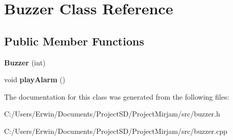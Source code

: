 \hypertarget{class_buzzer}{}\section{Buzzer Class Reference}
\label{class_buzzer}
\subsection*{Public Member Functions}
\begin{DoxyCompactItemize}
\item 
\hypertarget{class_buzzer_a38e926a694e675ae3034bf26b578b6f8}{}{\bfseries Buzzer} (int)\label{class_buzzer_a38e926a694e675ae3034bf26b578b6f8}

\item 
\hypertarget{class_buzzer_a7bada0b43035df88c745fc17f77880a0}{}void {\bfseries play\+Alarm} ()\label{class_buzzer_a7bada0b43035df88c745fc17f77880a0}

\end{DoxyCompactItemize}


The documentation for this class was generated from the following files\+:\begin{DoxyCompactItemize}
\item 
C\+:/\+Users/\+Erwin/\+Documents/\+Project\+S\+D/\+Project\+Mirjam/src/buzzer.\+h\item 
C\+:/\+Users/\+Erwin/\+Documents/\+Project\+S\+D/\+Project\+Mirjam/src/buzzer.\+cpp\end{DoxyCompactItemize}
